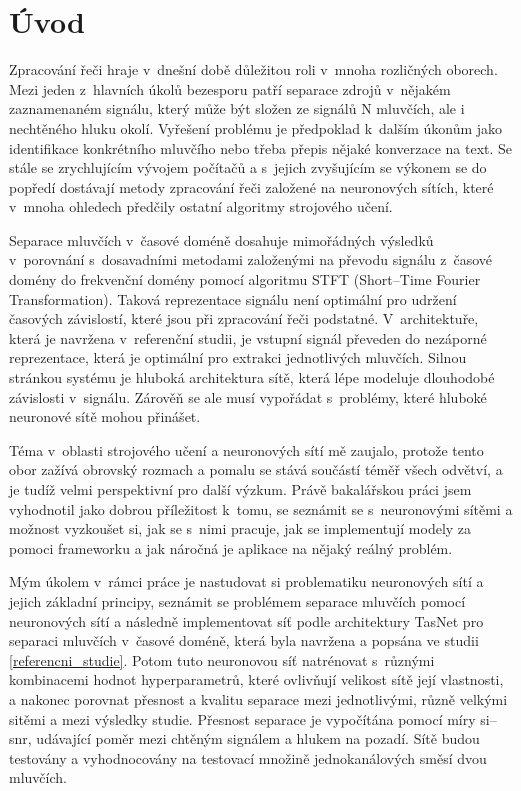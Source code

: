 \chapter{Úvod}
Zpracování řeči hraje v~dnešní době důležitou roli v~mnoha rozličných oborech. Mezi jeden z~hlavních úkolů bezesporu patří separace zdrojů v~nějakém zaznamenaném signálu, který může být složen ze signálů N mluvčích, ale i nechtěného hluku okolí. Vyřešení problému je předpoklad k~dalším úkonům jako identifikace konkrétního mluvčího nebo třeba přepis nějaké konverzace na text. Se stále se zrychlujícím vývojem počítačů a s~jejich zvyšujícím se výkonem se do popředí dostávají metody zpracování řeči založené na neuronových sítích, které v~mnoha ohledech předčily ostatní algoritmy strojového učení.

Separace mluvčích v~časové doméně dosahuje mimořádných výsledků v~porovnání s~dosavadními metodami  založenými na převodu signálu z~časové domény do frekvenční domény pomocí algoritmu STFT (Short--Time Fourier Transformation). Taková reprezentace signálu není optimální pro udržení časových závislostí, které jsou při zpracování řeči podstatné. V~architektuře, která je navržena v~referenční studii, je vstupní signál převeden do nezáporné reprezentace, která je optimální pro extrakci jednotlivých mluvčích. Silnou stránkou systému je hluboká architektura sítě, která lépe modeluje dlouhodobé závislosti v~signálu. Zárověň se ale musí vypořádat s~problémy, které hluboké neuronové sítě mohou přinášet.

Téma v~oblasti strojového učení a neuronových sítí mě zaujalo, protože tento obor zažívá obrovský rozmach a pomalu se stává součástí téměř všech odvětví, a je tudíž velmi perspektivní pro další výzkum. Právě bakalářskou práci jsem vyhodnotil jako dobrou příležitost k~tomu, se seznámit se s~neuronovými sítěmi a možnost vyzkoušet si, jak se s~nimi pracuje, jak se implementují modely za pomoci frameworku a jak náročná je aplikace na nějaký reálný problém.

Mým úkolem v~rámci práce je nastudovat si problematiku neuronových sítí a jejich základní principy, seznámit se problémem separace mluvčích pomocí neuronových sítí a následně implementovat síť podle architektury TasNet pro separaci mluvčích v~časové doméně, která byla navržena a popsána ve studii \ref{referencni_studie}. Potom tuto neuronovou síť natrénovat s~různými kombinacemi hodnot hyperparametrů, které ovlivňují velikost sítě  její vlastnosti, a nakonec porovnat přesnost a kvalitu separace mezi jednotlivými, různě velkými sitěmi a mezi výsledky studie. Přesnost separace je vypočítána pomocí míry si--snr, udávající poměr mezi chtěným signálem a hlukem na pozadí. Sítě budou testovány a vyhodnocovány na testovací množině jednokanálových směsí dvou mluvčích.

